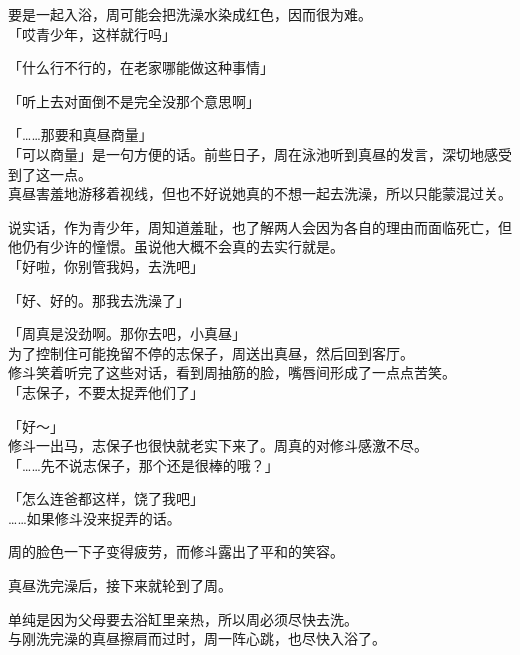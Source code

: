 要是一起入浴，周可能会把洗澡水染成红色，因而很为难。\\

「哎青少年，这样就行吗」

「什么行不行的，在老家哪能做这种事情」

「听上去对面倒不是完全没那个意思啊」

「……那要和真昼商量」\\

「可以商量」是一句方便的话。前些日子，周在泳池听到真昼的发言，深切地感受到了这一点。\\

真昼害羞地游移着视线，但也不好说她真的不想一起去洗澡，所以只能蒙混过关。

说实话，作为青少年，周知道羞耻，也了解两人会因为各自的理由而面临死亡，但他仍有少许的憧憬。虽说他大概不会真的去实行就是。\\

「好啦，你别管我妈，去洗吧」

「好、好的。那我去洗澡了」

「周真是没劲啊。那你去吧，小真昼」\\

为了控制住可能挽留不停的志保子，周送出真昼，然后回到客厅。\\

修斗笑着听完了这些对话，看到周抽筋的脸，嘴唇间形成了一点点苦笑。\\

「志保子，不要太捉弄他们了」

「好～」\\

修斗一出马，志保子也很快就老实下来了。周真的对修斗感激不尽。\\

「……先不说志保子，那个还是很棒的哦？」

「怎么连爸都这样，饶了我吧」\\

……如果修斗没来捉弄的话。

周的脸色一下子变得疲劳，而修斗露出了平和的笑容。\\

\vspace{2\baselineskip}

真昼洗完澡后，接下来就轮到了周。

单纯是因为父母要去浴缸里亲热，所以周必须尽快去洗。\\

与刚洗完澡的真昼擦肩而过时，周一阵心跳，也尽快入浴了。


